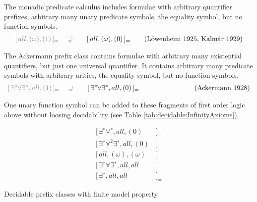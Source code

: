 \begin{example}\label{ex:monadic}
	The monadic predicate calculus includes formulae with arbitrary quantifier prefixes, 
	arbitrary many unary predicate symbols, the equality symbol, but no function symbols.
	\begin{gather*}
	{\colG [\,all, (\omega), (1)\,]_= 
	\quad\supsetneq}\qquad 
	[\,all, (\omega), (0 ) \,]_=
	\tag{Löwenheim 1925, Kalmár 1929}
	\end{gather*}
\end{example}

\begin{example}\label{ex:ackermann}
	The Ackermann prefix class contains formulae with arbitrary many existential quantifiers, 
	but just one universal quantifier. It contains arbitrary many predicate symbols
	with arbitrary arities, the equality symbol, but no function symbols. 
	\begin{gather*}
	{\colG [\,\exists^*\forall\exists^*,all,(1)\,]_=
	\quad\supsetneq}\qquad
	[\,\exists^*\forall\exists^*,all,(0) \,]_{=}\qquad\qquad\qquad 
	\tag{Ackermann 1928}
	\end{gather*}
\end{example}

\begin{remark}
	One unary function symbol can be added to these fragments of first order logic above 
	without loosing decidability (see Table \vref{tab:decidable:InfinityAxioms}).
\end{remark}


\begin{table}[hbt]
	\begin{align*}
	[\,\exists^{∗}\forall^{∗}, all, (0)&\,]_{=} \tag{Bernays, Schönfinkel 1928, Ramsey 1932}
	\\
	[\,\exists^{∗}\forall^2\exists^{∗} , all, (0)&\,] \tag{Gödel 1932, Kalmár 1933, Schütte 1934}
	\\
	[\,all, (\omega), (\omega)&\,] \tag{Löb 1967, Gurevich 1969}
	\\
	[\,\exists^{∗}\forall\exists^{∗}, all, all&\,] \tag{Gurevich 1973}
	\\
	[\,\exists^{∗}, all, all&\,]_{=} \tag{Gurevich 1976}
	\end{align*}
	\caption[Decidable prefix classes (finite)]{Decidable prefix classes with finite model property }
	\label{tab:decidedable:FiniteModelProperty}
\end{table}

